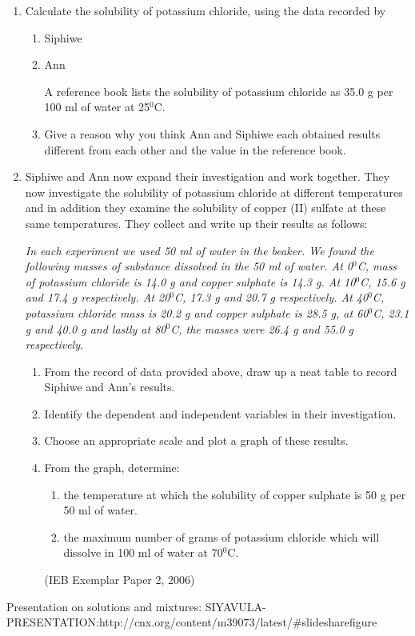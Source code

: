 {	\begin{enumerate}
	\item{Calculate the solubility of potassium chloride, using the data recorded by}
		\begin{enumerate}
		\item{Siphiwe}
		\item{Ann}
		

A reference book lists the solubility of potassium chloride as 35.0 g per 100 ml of water at 25$^{0}$C.
		\item{Give a reason why you think Ann and Siphiwe each obtained results different from each other and the value in the reference book.}
		\end{enumerate}

\item{Siphiwe and Ann now expand their investigation and work together. They now investigate the solubility of potassium chloride at different temperatures and in addition they examine the solubility of copper (II) sulfate at these same temperatures. They collect and write up their results as follows:}

\textit{In each experiment we used 50 ml of water in the beaker. We found the following masses of substance dissolved  in the 50 ml of water. At 0$^{0}$C, mass of potassium chloride is 14.0 g and copper sulphate is 14.3 g. At 10$^{0}$C, 15.6 g and 17.4 g respectively. At 20$^{0}$C, 17.3 g and 20.7 g respectively. At 40$^{0}$C, potassium chloride mass is 20.2 g and copper sulphate is 28.5 g, at 60$^{0}$C, 23.1 g and 40.0 g and lastly at 80$^{0}$C, the masses were 26.4 g and 55.0 g respectively.}

	\begin{enumerate}
	\item{From the record of data provided above, draw up a neat table to record Siphiwe and Ann's results.}
	\item{Identify the dependent and independent variables in their investigation.}
	\item{Choose an appropriate scale and plot a graph of these results.}
	\item{From the graph, determine:}
		\begin{enumerate}
		\item{the temperature at which the solubility of copper sulphate is 50 g per 50 ml of water.}
		\item{the maximum number of grams of potassium chloride which will dissolve in 100 ml of water at 70$^{0}$C.}
		\end{enumerate}
(IEB Exemplar Paper 2, 2006)
	\end{enumerate}
	\end{enumerate}
\practiceinfo
}Presentation on solutions and mixtures: SIYAVULA-PRESENTATION:http://cnx.org/content/m39073/latest/#slidesharefigure

